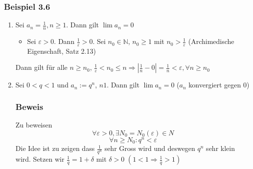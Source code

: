 \subsubsection*{Beispiel 3.6}
\begin{enumerate}
\item Sei $a_n=\frac{1}{n}, n\geq 1$. Dann gilt $\lim a_n=0$ 
\begin{itemize}
\item Sei $\varepsilon>0$. Dann $\frac{1}{\varepsilon}>0$. Sei $n_0\in\mathbb{N}$, $n_0\geq 1$ mit $n_0>\frac{1}{\varepsilon}$ (Archimedische Eigenschaft, Satz 2.13)\\ 
\end{itemize}
Dann gilt für alle $n\geq n_0$, $\frac{1}{\varepsilon}<n_0\leq n \Rightarrow \left| \frac{1}{n}-0\right| = \frac{1}{n}<\varepsilon, \forall n\geq n_0$
\item Sei $0<q<1$ und $a_n:=q^n$, $n 1$. Dann gilt $\lim a_n=0$ ($a_n$ konvergiert gegen 0)
\subsubsection*{Beweis}
Zu beweisen $$\forall \varepsilon > 0, \exists N_0=N_0(\varepsilon)\in N$$$$\forall n\geq N_0:q^n <\varepsilon$$
Die Idee ist zu zeigen dass $\frac{1}{q^n}$ sehr Gross wird und deswegen $q^n$ sehr klein wird. Setzen wir $\frac{1}{q}=1+\delta$ mit $\delta>0$ $\left( 1<1\Rightarrow \frac{1}{q}>1\right)$ %
\end{enumerate}















